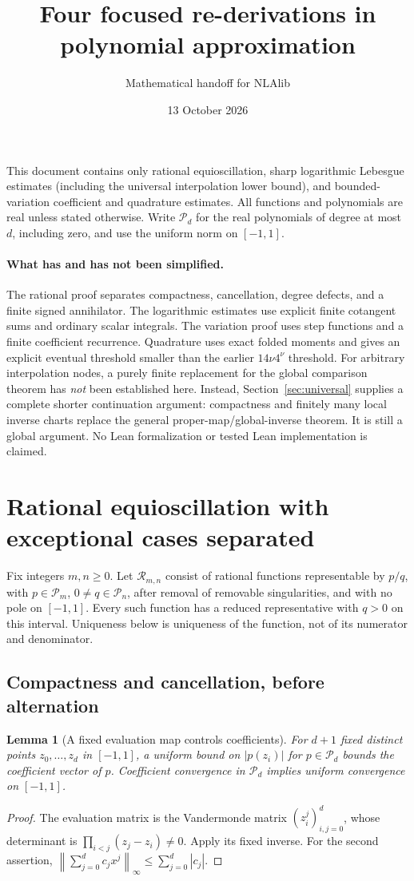 \documentclass[11pt]{article}
\title{Four focused re-derivations in polynomial approximation}
\author{Mathematical handoff for NLAlib}
\date{13 October 2026}
\newcommand{\PP}{\mathcal P}
\newcommand{\norm}[1]{\left\lVert#1\right\rVert}
\newtheorem{lemma}[theorem]{Lemma}
\theoremstyle{remark}\newtheorem{remark}[theorem]{Remark}
\begin{document}
\maketitle
\noindent This document contains only rational equioscillation, sharp logarithmic
Lebesgue estimates (including the universal interpolation lower bound), and
bounded-variation coefficient and quadrature estimates. All functions and
polynomials are real unless stated otherwise. Write $\PP_d$ for the real
polynomials of degree at most $d$, including zero, and use the uniform norm
on $[-1,1]$.

\paragraph{What has and has not been simplified.}
The rational proof separates compactness, cancellation, degree defects, and
a finite signed annihilator. The logarithmic estimates use explicit finite
cotangent sums and ordinary scalar integrals. The variation proof uses step
functions and a finite coefficient recurrence. Quadrature uses exact folded
moments and gives an explicit eventual threshold smaller than the earlier
$14\nu4^\nu$ threshold.
For arbitrary interpolation nodes, a purely finite replacement for the
global comparison theorem has \emph{not} been established here. Instead,
Section~\ref{sec:universal} supplies a complete shorter continuation argument:
compactness and finitely many local inverse charts replace the general
proper-map/global-inverse theorem. It is still a global argument. No Lean
formalization or tested Lean implementation is claimed.
\tableofcontents

\section{Rational equioscillation with exceptional cases separated}
\label{sec:rational}
Fix integers $m,n\ge0$. Let $\mathcal R_{m,n}$ consist of rational functions
representable by $p/q$, with $p\in\PP_m$, $0\ne q\in\PP_n$, after removal of
removable singularities, and with no pole on $[-1,1]$. Every such function has
a reduced representative with $q>0$ on this interval. Uniqueness below is
uniqueness of the function, not of its numerator and denominator.

\subsection{Compactness and cancellation, before alternation}
\begin{lemma}[A fixed evaluation map controls coefficients]\label{lem:vander}
For $d+1$ fixed distinct points $z_0,\ldots,z_d$ in $[-1,1]$, a uniform bound
on $|p(z_i)|$ for $p\in\PP_d$ bounds the coefficient vector of $p$.
Coefficient convergence in $\PP_d$ implies uniform convergence on $[-1,1]$.
\end{lemma}
\begin{proof}
The evaluation matrix is the Vandermonde matrix $(z_i^j)_{i,j=0}^d$, whose
determinant is $\prod_{i<j}(z_j-z_i)\ne0$. Apply its fixed inverse. For the
second assertion, $\norm{\sum_{j=0}^d c_jx^j}_\infty\le\sum_{j=0}^d|c_j|$.
\end{proof}
\end{document}
